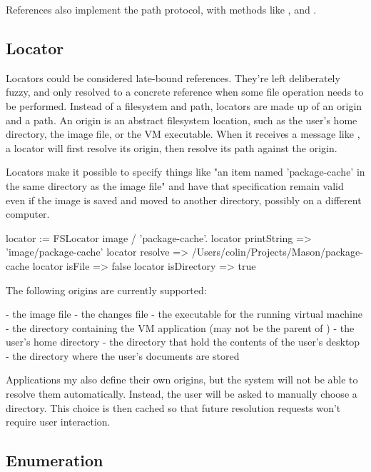 \documentclass[a4paper,10pt,twoside]{book}
\begin{document}
References also implement the path protocol, with methods like \ct{/} ,  and .

\subsection{Locator}

Locators could be considered late-bound references. They're left deliberately fuzzy, and only resolved to a concrete reference when some file operation needs to be performed. Instead of a filesystem and path, locators are made up of an origin and a path. An origin is an abstract filesystem location, such as the user's home directory, the image file, or the VM executable. When it receives a message like , a locator will first resolve its origin, then resolve its path against the origin.

Locators make it possible to specify things like "an item named 'package-cache' in the same directory as the image file" and have that specification remain valid even if the image is saved and moved to another directory, possibly on a different computer.

\begin{code}{}
    locator := FSLocator image / 'package-cache'.
    locator printString             => '{image}/package-cache'
    locator resolve                 => /Users/colin/Projects/Mason/package-cache
    locator isFile                  => false
    locator isDirectory             => true
\end{code}	

The following origins are currently supported:

 - the image file
 - the changes file
 - the executable for the running virtual machine
 - the directory containing the VM application (may not be the parent of )
 - the user's home directory
 - the directory that hold the contents of the user's desktop
 - the directory where the user's documents are stored


Applications my also define their own origins, but the system will not be able to resolve them automatically. Instead, the user will be asked to manually choose a directory. This choice is then cached so that future resolution requests won't require user interaction.

\subsection{Enumeration}
\end{document}
